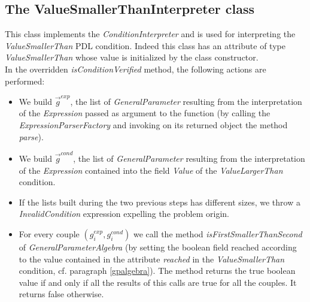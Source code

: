 \documentclass[a4paper,11pt] {ivoa}
\begin{document}
\subsection{The ValueSmallerThanInterpreter class}
This class implements the  {\it ConditionInterpreter} and is used for interpreting the {\it ValueSmallerThan} PDL condition. Indeed this class has an attribute of type {\it ValueSmallerThan} whose value is initialized by the class constructor. \\
In the overridden {\it isConditionVerified} method, the following actions are performed:
\begin{itemize}
\item We build $\vec g^{exp}$, the list of {\it GeneralParameter} resulting from the interpretation of the {\it Expression} passed as argument to the function (by calling the {\it ExpressionParserFactory} and invoking on its returned object the method {\it parse}).
\item We build $\vec g^{cond}$, the list of {\it GeneralParameter} resulting from the interpretation of the {\it Expression} contained into the field {\it Value} of the {\it ValueLargerThan} condition.
\item If the lists built during the two previous steps has different sizes, we throw a {\it InvalidCondition} expression expelling the problem origin. 
\item For every couple $(g_i^{exp}, g_i^{cond})$ we call the method  {\it isFirstSmallerThanSecond} of {\it GeneralParameterAlgebra} (by setting the boolean field reached according to the value contained in the attribute {\it reached} in the  {\it ValueSmallerThan} condition, cf. paragraph \ref{gpalgebra}). The method returns the true boolean value if and only if all the results of this calls are true for all the couples. It returns false otherwise. 
\end{itemize}
\end{document}
